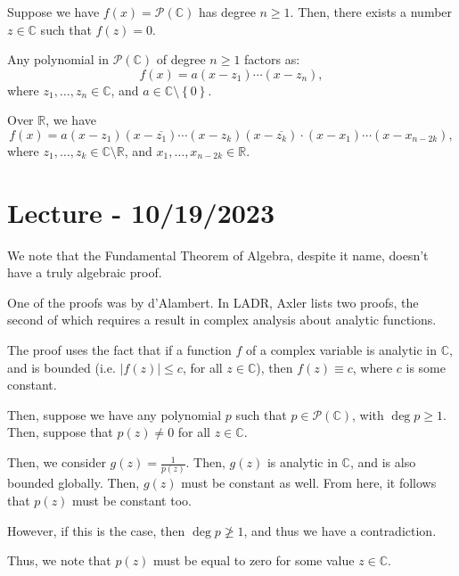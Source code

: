 \documentclass[openany]{book}
\newcommand{\CC}{\mathbb{C}}
\newcommand{\RR}{\mathbb{R}}
\begin{document}
\begin{thm}
	Suppose we have $f(x) = \mathscr{P}(\CC)$ has degree $n \geq 1$. Then, there exists a number $z \in \CC$ such that $f(z) = 0$.
\end{thm}
\begin{lem}
	Any polynomial in $\mathscr{P}(\CC)$ of degree $n \geq 1$ factors as:
	\begin{equation*}
		f(x) = a(x-z_{1}) \cdots (x-z_{n}),
	\end{equation*}
	where $z_{1}, \ldots, z_{n} \in \CC$, and $a \in \CC \setminus \left\{  0\right\}$.
\end{lem}
\begin{rmk}
	Over $\RR$, we have
	\begin{equation*}
		f(x) = a(x-z_{1})(x-\overline{z_{1}})\cdots(x-z_{k})(x-\overline{z_{k}}) \cdot (x-x_{1}) \cdots (x-x_{n-2k}),
	\end{equation*}
	where $z_{1}, \ldots, z_{k} \in \CC \setminus \RR$, and $x_{1}, \ldots, x_{n-2k} \in \RR$.
\end{rmk}

\section{Lecture - 10/19/2023}
\begin{rmk}
	We  note that the Fundamental Theorem of Algebra, despite it name, doesn't have a truly algebraic proof.
	
	One of the proofs was by d'Alambert. In LADR, Axler lists two proofs, the second of which requires a result in complex analysis about analytic functions.
	
	The proof uses the fact that if a function $f$ of a complex variable is analytic in $\CC$, and is bounded (i.e. $\lvert f(z) \rvert \leq c$, for all $z \in \CC$), then $f(z) \equiv c$, where $c$ is some constant.
	
	Then, suppose we have any polynomial $p$ such that $p \in \mathscr P(\CC)$, with $\deg p \geq 1$. Then, suppose that $p(z) \neq 0$ for all $z \in \CC$.
	
	Then, we consider $g(z) = \frac{1}{p(z)}$. Then, $g(z)$ is analytic in $\CC$, and is also bounded globally. Then, $g(z)$ must be constant as well. From here, it follows that $p(z)$ must be constant too.
	
	However, if this is the case, then $\deg p \not\geq 1$, and thus we have a contradiction.
	
	Thus, we note that $p(z)$ must be equal to zero for some value $z \in \CC$.
\end{rmk}
\end{document}
